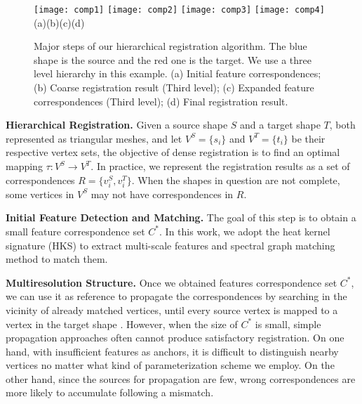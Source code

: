 \begin{figure}
\centering
  \texttt{[image: comp1]}
\hspace{10pt}
  \texttt{[image: comp2]}
\hspace{10pt}
  \texttt{[image: comp3]}
\hspace{10pt}
  \texttt{[image: comp4]}\\
(a)\hspace{0.21\linewidth}(b)\hspace{0.21\linewidth}(c)\hspace{0.21\linewidth}(d)
  \caption[Steps of hierarchical registration algorithm.]
  {Major steps of our hierarchical registration algorithm. The blue shape is the source and the red one is the target. We use a three level hierarchy in this example. (a) Initial feature correspondences; (b) Coarse registration result (Third level); (c) Expanded feature correspondences (Third level); (d) Final registration result.}
\label{fig:components}
\end{figure}

\textbf{Hierarchical Registration.}
Given a source shape $S$ and a target shape $T$, both represented as triangular meshes, and let $V^S=\{s_i\}$ and $V^T=\{t_i\}$ be their respective vertex sets, the objective of dense registration is to find an optimal mapping $\tau: V^S \to V^T$. In practice, we represent the registration results as a set of correspondences $R=\{v^S_i, v^T_i\}$. When the shapes in question are not complete, some vertices in $V^S$ may not have correspondences in $R$.

\textbf{Initial Feature Detection and Matching.}
The goal of this step is to obtain a small feature correspondence set $C^*$.
In this work, we adopt the heat kernel signature (HKS) \cite{Sun:2009:CGF}
to extract multi-scale features and spectral graph matching
method \cite{Leordeanu:2005a:ICCV} to match them.

\textbf{Multiresolution Structure.}
Once we obtained features correspondence set $C^*$, we can use it as reference to propagate the correspondences by searching in the vicinity of already matched vertices, until every source vertex is mapped to a vertex in the target shape \cite{Hou:2011:TVCG,Huang:2008:CGF}. However, when the size of $C^*$ is small, simple propagation approaches often cannot produce satisfactory registration. On one hand, with insufficient features as anchors, it is difficult to distinguish nearby vertices no matter what kind of parameterization scheme we employ. On the other hand, since the sources for propagation are few, wrong correspondences are more likely to accumulate following a mismatch.

